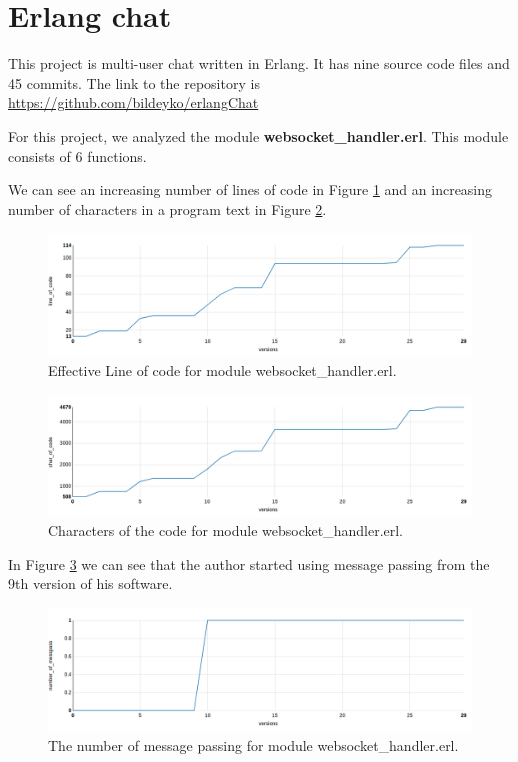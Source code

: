 \section{Erlang chat }

This project is multi-user chat written in Erlang. It has nine source code files and 45 commits. The link to the repository is \url{https://github.com/bildeyko/erlangChat}

For this project, we analyzed the module \textbf{websocket\_handler.erl}. This module consists of 6 functions.

We can see an increasing number of lines of code in Figure \ref{fig:loc_chat} and an increasing number of characters in a program text in Figure \ref{fig:char_of_code_chat}.

\begin{figure}[ht]
	\centering
	\includegraphics[width=\textwidth]{figures/loc_chat.png}
	\caption{Effective Line of code for module websocket\_handler.erl.}
	\label{fig:loc_chat}
\end{figure}

\begin{figure}[ht]
	\centering
	\includegraphics[width=\textwidth]{figures/char_of_code_chat.png}
	\caption{Characters of the code for module websocket\_handler.erl.}
	\label{fig:char_of_code_chat}
\end{figure}

In Figure \ref{fig:chat} we can see that the author started using message passing from the 9th version of his software.

\begin{figure}[ht]
	\centering
	\includegraphics[width=\textwidth]{figures/chat.png}
	\caption{The number of message passing for module websocket\_handler.erl.}
	\label{fig:chat}
\end{figure}

